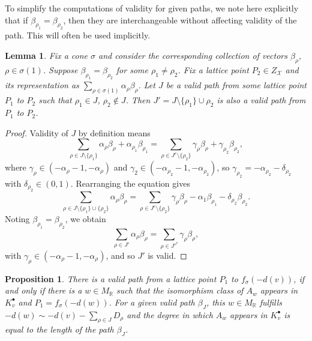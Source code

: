 \documentclass[reqno, 12pt]{amsart}
\newtheorem{lemma}[theorem]{Lemma}
\newtheorem{proposition}[theorem]{Proposition}
\theoremstyle{definition}
\numberwithin{equation}{section}
\newcommand{\R}{\mathbb{R}}
\begin{document}
To simplify the computations of validity for given paths, we note here explicitly that if $\beta_{\rho_1}=\beta_{\rho_2}$, then they are interchangeable without affecting validity of the path. This will often be used implicitly.
\begin{lemma}
    \label{Lem:InterchangBeta}
    Fix a cone $\sigma$ and consider the corresponding collection of vectors $\beta_\rho$, $\rho\in \sigma(1)$. Suppose $\beta_{\rho_1}=\beta_{\rho_2}$ for some $\rho_1\neq \rho_2$. Fix a lattice point $P_2\in Z_{\mathcal{X}}$ and its representation as $\sum_{\rho\in \sigma(1)}\alpha_\rho\beta_\rho$. Let $J$ be a valid path from some lattice point $P_1$ to $P_2$ such that $\rho_1\in J$, $\rho_2\not\in J$. Then $J'=J\setminus\{\rho_1\}\cup \rho_2$ is also a valid path from $P_1$ to $P_2$.
\end{lemma}
\begin{proof}
    Validity of $J$ by definition means\[
    \sum_{\rho\in J\setminus\{\rho_1\}}\alpha_\rho\beta_\rho +\alpha_{\rho_1}\beta_{\rho_1}=\sum_{\rho\in J^c\setminus \{\rho_2\}}\gamma_\rho\beta_\rho +\gamma_{\rho_2}\beta_{\rho_2},
    \]
    where $\gamma_\rho\in (-\alpha_\rho-1,-\alpha_\rho)$ and $\gamma_2\in (-\alpha_{\rho_2}-1,-\alpha_{\rho_2})$, so $\gamma_{\rho_2}=-\alpha_{\rho_2}-\delta_{\rho_2}$ with $\delta_{\rho_2}\in (0,1)$. Rearranging the equation gives\[
    \sum_{\rho\in J\setminus\{\rho_1\}\cup\{\rho_2\}}\alpha_\rho\beta_\rho=\sum_{\rho\in J^c\setminus\{\rho_2\}}\gamma_\rho\beta_\rho -\alpha_1\beta_{\rho_1}-\delta_{\rho_2}\beta_{\rho_2}.
    \]
    Noting $\beta_{\rho_1}=\beta_{\rho_2}$, we obtain\[
    \sum_{\rho\in J'}\alpha_\rho\beta_\rho=\sum_{\rho\in J'^c}\gamma_\rho\beta_\rho,
    \]
    with $\gamma_\rho\in (-\alpha_\rho-1,-\alpha_\rho)$, and so $J'$ is valid.
\end{proof}

\begin{proposition}
    \label{Prop:CplxViaPaths2}
    There is a valid path from a lattice point $P_1$ to $f_\sigma(-d(v))$, if and only if there is a $w\in M_\R$ such that the isomorphism class of $A_w$ appears in $K_v^\bullet$ and $P_1=f_\sigma(-d(w))$. For a given valid path $\beta_J$, this $w\in M_\R$ fulfills $-d(w)\sim -d(v)-\sum_{\rho\in J}D_\rho$ and the degree in which $A_w$ appears in $K_v^\bullet$ is equal to the length of the path $\beta_J$.
\end{proposition}
\end{document}
